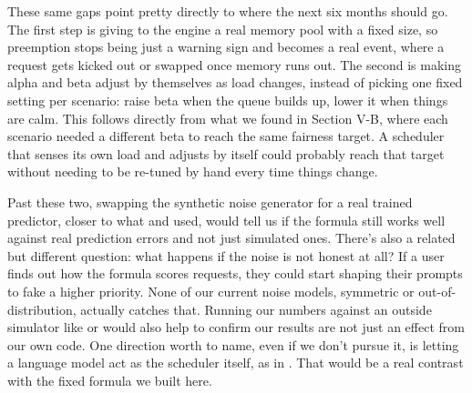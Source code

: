 These same gaps point pretty directly to where the next six months should go. The first step is giving to the engine a real memory pool with a fixed size, so preemption stops being just a warning sign and becomes a real event, where a request gets kicked out or swapped once memory runs out. The second is making alpha and beta adjust by themselves as load changes, instead of picking one fixed setting per scenario: raise beta when the queue builds up, lower it when things are calm. This follows directly from what we found in Section V-B, where each scenario needed a different beta to reach the same fairness target. A scheduler that senses its own load and adjusts by itself could probably reach that target without needing to be re-tuned by hand every time things change.

Past these two, swapping the synthetic noise generator for a real trained predictor, closer to what \cite{kumar2024latency} and \cite{fu2024ltr} used, would tell us if the formula still works well against real prediction errors and not just simulated ones. There's also a related but different question: what happens if the noise is not honest at all? If a user finds out how the formula scores requests, they could start shaping their prompts to fake a higher priority. None of our current noise models, symmetric or out-of-distribution, actually catches that. Running our numbers against an outside simulator like \cite{cho2024llmservingsim} or \cite{agrawal2024vidur} would also help to confirm our results are not just an effect from our own code. One direction worth to name, even if we don't pursue it, is letting a language model act as the scheduler itself, as in \cite{abgaryan2024llmschedule}. That would be a real contrast with the fixed formula we built here.